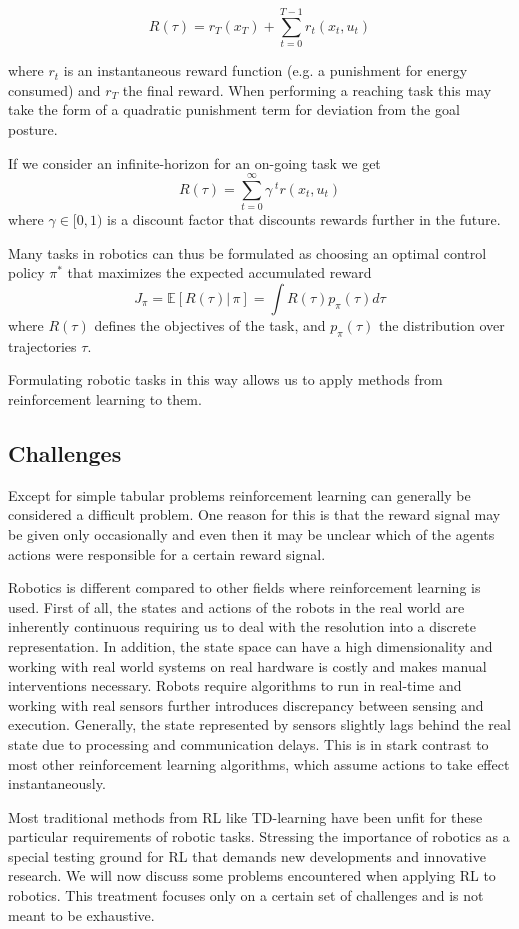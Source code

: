 $$ R(\tau) = r_T(x_T) + \sum^{T-1}_{t=0} r_t(x_t,u_t) $$

where $r_t$ is an instantaneous reward function
(e.g. a punishment for energy consumed)
and $r_T$ the final reward. When performing a reaching task this may take the
form of a quadratic punishment term for deviation from the goal posture.

If we consider an infinite-horizon for an on-going task we get
$$ R(\tau) = \sum^{\infty}_{t=0} \gamma^{\; t} r(x_t, u_t) $$
where $\gamma \in [0,1)$ is a discount factor that discounts
rewards further in the future.

Many tasks in robotics can thus be formulated as choosing an optimal control
policy $\pi^*$ that maximizes the expected accumulated reward
$$ J_{\pi} = \mathbb{E}[R(\tau) |\, \pi] = \int R(\tau) p_{\pi}(\tau) d\tau $$
where $R(\tau)$ defines the objectives of the task, and $p_{\pi}(\tau)$ the
distribution over trajectories $\tau$.

Formulating robotic tasks in this way allows us to apply methods from
reinforcement learning to them. 

\subsection{Challenges}
Except for simple tabular problems reinforcement
learning can generally be considered a difficult problem.
One reason for this is that the reward signal may be given
only occasionally and
even then it may be unclear which of
the agents actions were responsible for a certain
reward signal. 

Robotics is different compared to other fields where reinforcement learning
is used. First of all, the states and actions of the robots in the
real world are inherently continuous requiring us to
deal with the resolution into a discrete representation.
In addition, the state space can have a high dimensionality and
working with real world systems on real hardware is costly and
makes manual interventions necessary.
Robots require algorithms to run in real-time and working with
real sensors further introduces discrepancy between sensing and
execution.
Generally, the state represented by sensors slightly lags behind the real
state due to processing and communication delays. This is in stark contrast to
most other reinforcement learning algorithms, which assume actions to
take effect instantaneously.


Most traditional methods from RL like
TD-learning \citep{sutton2018reinforcement}
have been unfit for these particular requirements of robotic tasks.
Stressing the importance of robotics as a special testing ground for RL that
demands new developments and innovative research.
We will now discuss some problems encountered when applying
RL to robotics. This treatment focuses only on a certain
set of challenges and is not meant to be exhaustive.

